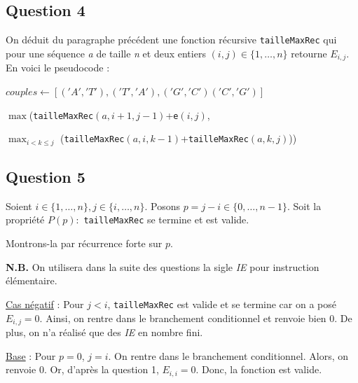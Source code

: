 \documentclass[12pt,a4paper]{article}
\begin{document}
\subsection{Question 4}
On d\'eduit du paragraphe pr\'ec\'edent une fonction r\'ecursive \texttt{tailleMaxRec} qui pour une s\'equence {\itshape a} de taille {\itshape n} et deux entiers \( (i,j) \in \{1, \dotsc, n\} \) retourne \( E_{i,j} \). En voici le pseudocode :
\begin{algorithm}
\begin{algorithmic}[1]
\State $couples \gets [('A','T'),('T','A'),('G','C')('C','G')]$
 
\EndIf
\State {}
\EndFunction
\end{algorithmic}
\end{algorithm}
\begin{algorithm}
\begin{algorithmic}[1]
 
\EndIf
\State \Return $\max$(\texttt{tailleMaxRec}$(a,i+1,j-1)$+\texttt{e}$(i,j)$,

 $\max_{i<k\leq j}$ (\texttt{tailleMaxRec}$(a,i,k-1)$+\texttt{tailleMaxRec}$(a,k,j)$))
\EndFunction
\end{algorithmic}
\end{algorithm}

\subsection{Question 5}
Soient \( i \in \{ 1, \dotsc, n \}, j \in \{ i, \dotsc, n \} \). Posons \( p = j-i \in \{ 0, \dotsc, n-1 \} \). Soit la propri\'et\'e \( P(p) : \) \texttt{tailleMaxRec} se termine et est valide. 

Montrons-la par r\'ecurrence forte sur $p$.

{\bfseries N.B.} On utilisera dans la suite des questions la sigle {\itshape IE} pour instruction \'el\'ementaire.


\underline{Cas n\'egatif} : Pour $j < i$, \texttt{tailleMaxRec} est valide et se termine car on a pos\'e $E_{i,j} = 0$. Ainsi, on rentre dans le branchement conditionnel et renvoie bien $0$. De plus, on n'a r\'ealis\'e que des {\itshape IE} en nombre fini.


\underline{Base} : Pour \( p = 0\), \( j = i \). On rentre dans le branchement conditionnel. Alors, on renvoie $0$. Or, d'apr\`es la question 1, \( E_{i,i} = 0 \). Donc, la fonction est valide.
\end{document}
